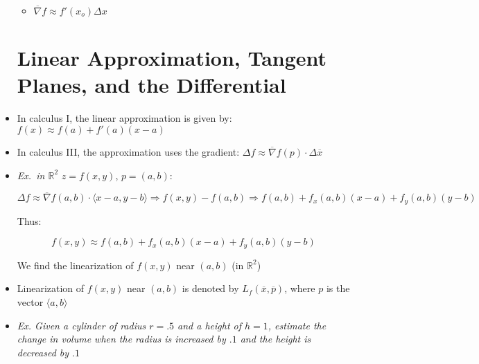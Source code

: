 \begin{itemize}
\begin{itemize}
      \item $\overline{\nabla} f\approx f'(x_o)\Delta x$

    \end{itemize}

    \section{Linear Approximation, Tangent Planes, and the Differential}

  \item In calculus I, the linear approximation is given by: $f(x) \approx f(a) + f'(a)(x-a)$

  \item  In calculus III, the approximation uses the gradient: $\Delta f\approx \overline{\nabla} f(p) \cdot \Delta \overline{x}$

  \item \textit{Ex.\ in $\mathbb{R}^2$} $z=f(x,y)$, $p=(a,b)$:

    \vspace{-20pt}

    $$\Delta f \approx \overline{\nabla}f(a,b) \cdot \langle x-a, y-b \rangle \Rightarrow f(x,y) - f(a,b) \Rightarrow f(a,b) + f_x(a,b)(x-a) + f_y(a,b)(y-b)$$

    \vspace{-20pt}

    \begin{center}
      Thus:
    \end{center}

    \vspace{-25pt}

    $$f(x,y) \approx f(a,b) + f_x(a,b)(x-a) + f_y(a,b)(y-b)$$

    \vspace{-15pt}

    \begin{center}
      We find the linearization of $f(x,y)$ near $(a,b)$ (in $\mathbb{R}^2$)
    \end{center}

  \item Linearization of $f(x,y)$ near $(a,b)$ is denoted by $L_f(\overline{x},\overline{p})$, where $p$ is the vector $\langle a, b \rangle$

  \item \textit{Ex. Given a cylinder of radius $r=.5$ and a height of $h=1$, estimate the change in volume when the radius is increased by $.1$ and the height is decreased by $.1$}


\end{itemize}

